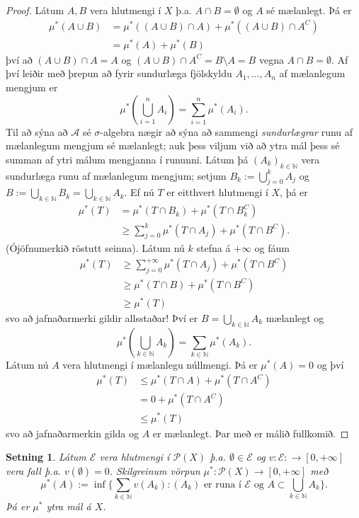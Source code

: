 \documentclass[a4paper,icelandic,11pt]{book}
\theoremstyle{plain}      \newtheorem{setn}{Setning}[chapter]
\theoremstyle{definition} \newtheorem{skilgr}[setn]{Skilgreining}
\theoremstyle{remark}     \newtheorem*{ath}{Athugasemd}
\newcommand{\N}{\mathbb N}
\begin{document}
\begin{proof}
  Látum $A,B$ vera hlutmengi í $X$ þ.a. $A\cap B=\emptyset$ og $A$ sé
  mælanlegt. Þá er
  \begin{align*}
    \mu^{*}(A\cup B)
    &= \mu^{*}((A\cup B)\cap A) + \mu^{*}((A\cup B)\cap A^{C}) \\
    &= \mu^{*}(A) + \mu^{*}(B)
  \end{align*}
  því að $(A\cup B)\cap A = A$ og
  $(A\cup{B})\cap{A^{C}}=B\setminus{A}=B$ vegna
  $A\cap{B}=\emptyset$. Af því leiðir með þrepun að fyrir sundurlæga
  fjölskyldu $A_{1},\dots,A_{n}$ af mælanlegum mengjum er
  \[
  \mu^*(\bigcup_{i=1}^{n}A_{i}) = \sum_{i=1}^{n}\mu^{*}(A_{i}).
  \]
  Til að sýna að $\mathcal A$ sé $\sigma$-algebra nægir að sýna að
  sammengi \emph{sundurlægrar} runu af mælanlegum mengjum sé
  mælanlegt; auk þess viljum við að ytra mál þess sé summan af ytri
  málum mengjanna í rununni. Látum þá $(A_{k})_{k\in\N}$ vera
  sundurlæga runu af mælanlegum mengjum; setjum
  $B_{k}:=\bigcup_{j=0}^{k}A_{j}$ og
  $B:=\bigcup_{k\in\N}B_{k}=\bigcup_{k\in\N}A_{k}$. Ef nú $T$ er
  eitthvert hlutmengi í $X$, þá er
  \begin{align*}
    \mu^{*}(T)
    &= \mu^{*}(T\cap B_{k}) + \mu^{*}(T\cap B_{k}^{C}) \\
    &\ge \sum_{j=0}^{k}\mu^{*}(T\cap A_{j}) + \mu^{*}(T\cap B^{C}).
  \end{align*}
  (Ójöfnumerkið röstutt seinna). Látum nú $k$ stefna á $+\infty$ og
  fáum
  \begin{align*}
    \mu^{*}(T)
    &\ge \sum_{j=0}^{+\infty}\mu^{*}(T\cap A_{j})+\mu^{*}(T\cap B^{C})
    \\
    &\ge \mu^{*}(T\cap B) + \mu^{*}(T\cap B^{C})
    \\
    &\ge \mu^{*}(T)
  \end{align*}
  svo að jafnaðarmerki gildir allsstaðar! Því er
  $B=\bigcup_{k\in\N}A_{k}$ mælanlegt og
  \[
  \mu^{*}(\bigcup_{k\in\N}A_{k})
  = \sum_{k\in\N}\mu^{*}(A_{k}).
  \]
  Látum nú $A$ vera hlutmengi í mælanlegu núllmengi. Þá er
  $\mu^{*}(A)=0$ og því
  \begin{align*}
    \mu^{*}(T)
    &\le \mu^{*}(T\cap A) + \mu^{*}(T\cap A^{C}) \\
    &= 0 + \mu^{*}(T\cap A^{C}) \\
    &\le \mu^{*}(T)
  \end{align*}
  svo að jafnaðarmerkin gilda og $A$ er mælanlegt. Þar með er málið
  fullkomið.
\end{proof}
\begin{setn}
  Látum $\mathcal E$ vera hlutmengi í $\mathcal P(X)$
  þ.a. $\emptyset\in\mathcal E$ og
  $v:\mathcal{E}:\to\left[0,+\infty\right]$ vera fall
  þ.a. $v(\emptyset)=0$. Skilgreinum vörpun
  $\mu^{*}:\mathcal{P}(X)\to\left[0,+\infty\right]$ með
  \[
  \mu^{*}(A) := \inf \{
  \sum_{k\in\N} v(A_{k})
  : (A_{k})\text{ er runa í }\mathcal E
  \text{ og }
  A\subset\bigcup_{k\in\N} A_{k}
  \}.
  \]
  Þá er $\mu^{*}$ ytra mál á $X$.
\end{setn}
\end{document}
